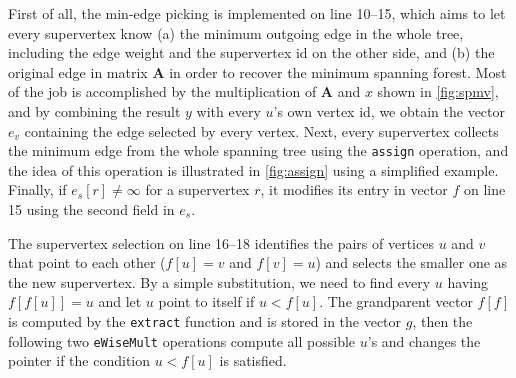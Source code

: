 \documentclass{sokendai_thesis} %
\begin{document}
First of all, the min-edge picking is implemented on line 10--15, which aims to let every supervertex know (a) the minimum outgoing edge in the whole tree, including the edge weight and the supervertex id on the other side, and (b) the original edge in matrix $\mathbf{A}$ in order to recover the minimum spanning forest.
Most of the job is accomplished by the multiplication of $\mathbf{A}$ and $x$ shown in \autoref{fig:spmv}, and by combining the result $y$ with every $u$'s own vertex id, we obtain the vector $e_v$ containing the edge selected by every vertex.
Next, every supervertex collects the minimum edge from the whole spanning tree using the \texttt{assign} operation, and the idea of this operation is illustrated in \autoref{fig:assign} using a simplified example.
Finally, if $e_s[r]\neq \infty$ for a supervertex $r$, it modifies its entry in vector $f$ on line 15 using the second field in $e_s$.

The supervertex selection on line 16--18 identifies the pairs of vertices $u$ and $v$ that point to each other ($f[u]=v$ and $f[v]=u$) and selects the smaller one as the new supervertex.
By a simple substitution, we need to find every $u$ having $f[f[u]]=u$ and let $u$ point to itself if $u<f[u]$.
The grandparent vector $f[f]$ is computed by the \texttt{extract} function and is stored in the vector $\mathit{g}$, then the following two \texttt{eWiseMult} operations compute all possible $u$'s and changes the pointer if the condition $u<f[u]$ is satisfied.
\end{document}
